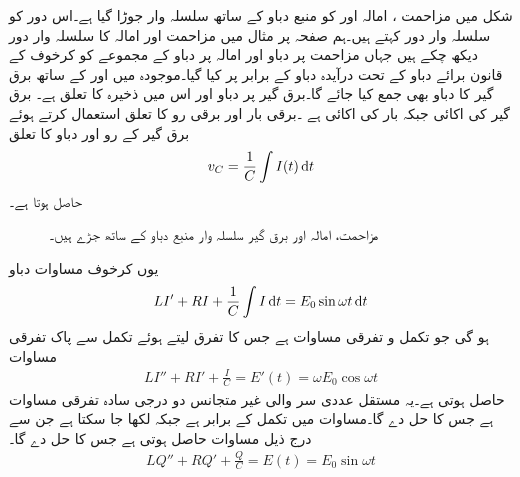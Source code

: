 شکل  میں  مزاحمت ، امالہ  اور    کو منبع دباو کے ساتھ سلسلہ وار جوڑا گیا ہے۔اس دور کو سلسلہ وار  دور کہتے ہیں۔ہم صفحہ  پر مثال  میں مزاحمت اور امالہ کا سلسلہ وار  دور دیکھ چکے ہیں جہاں مزاحمت پر دباو  اور امالہ پر دباو  کے مجموعے کو کرخوف کے قانون برائے دباو کے تحت درآیدہ دباو  کے برابر پر کیا گیا۔موجودہ  میں  اور  کے ساتھ برق گیر کا دباو  بھی جمع کیا جائے گا۔برق گیر پر دباو  اور اس میں ذخیرہ   کا تعلق  ہے۔ برق گیر کی اکائی   جبکہ بار کی اکائی   ہے ۔برقی بار اور برقی رو کا تعلق  استعمال کرتے ہوئے برق گیر کے رو اور دباو کا تعلق 
\begin{align}
v_C=\frac{1}{C}\int I(t) \dif t
\end{align}
حاصل ہوتا ہے۔
\begin{figure}
\centering
{}
\caption{مزاحمت، امالہ اور برق گیر سلسلہ وار منبع دباو کے ساتھ جڑے ہیں۔}
\label{شکل_سادہ_دو_سلسلہ_وار_دور_الف}
\end{figure}

یوں کرخوف مساوات دباو
\begin{align}\label{مساوات_سادہ_دو_سلسلہ_وار_الف}
LI'+RI+\frac{1}{C}\int I\dif t=E_0\sin \omega t\dif t
\end{align}
ہو گی جو تکمل و تفرقی مساوات ہے جس کا تفرق لیتے ہوئے تکمل سے پاک تفرقی مساوات
\begin{align}\label{مساوات_سادہ_دو_سلسلہ_وار_ب}
LI''+RI'+\frac{I}{C}=E'(t)=\omega E_0\cos \omega t
\end{align}
 حاصل ہوتی ہے۔یہ مستقل عددی سر والی غیر متجانس دو درجی سادہ تفرقی مساوات ہے جس کا حل  دے گا۔مساوات  میں تکمل  کے برابر ہے جبکہ   لکھا جا سکتا ہے جن سے درج ذیل مساوات حاصل ہوتی ہے جس کا حل  دے گا۔
\begin{align}\label{مساوات_سادہ_دو_سلسلہ_وار_پ}
LQ''+RQ'+\frac{Q}{C}=E(t)=E_0\sin \omega t
\end{align}

